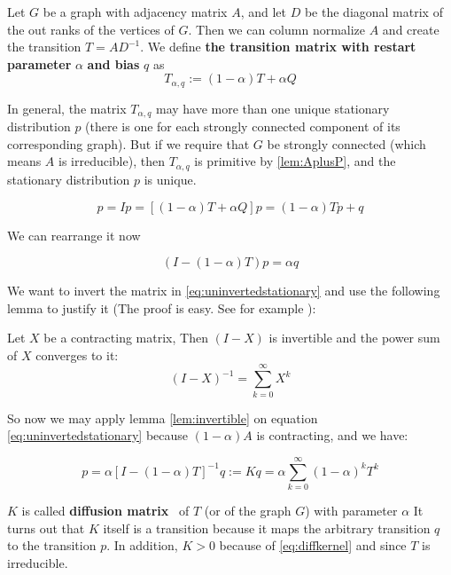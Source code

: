 \begin{mydef}
\label{def:Transitionbiased}
Let $G$ be a graph with adjacency matrix $A$, and let $D$ be the
diagonal matrix of the out ranks of the vertices of $G$. Then we can
column normalize $A$ and create the transition $T = AD^{-1}$.
We define \textbf{the transition matrix with restart parameter}
$\alpha$ \textbf{and bias} $q$ as
\[
T_{\alpha, q} :=
(1 - \alpha)T + \alpha Q
\]
\end{mydef}

In general, 
the matrix $T_{\alpha,q}$ may have more than one unique stationary distribution $p$ 
(there is one for each strongly connected
component of its corresponding graph). But if we require that $G$ be
strongly connected (which means $A$ is irreducible),
then $T_{\alpha,q}$ is primitive by \ref{lem:AplusP}, and the
stationary distribution $p$ is unique.

\[
p = Ip
= [(1 - \alpha)T + \alpha Q]p =  (1 - \alpha)Tp + q 
\]

We can rearrange it now

\begin{equation}
\label{eq:uninvertedstationary}
(I - (1 - \alpha)T)p = \alpha q
\end{equation}

We want to invert the matrix in \ref{eq:uninvertedstationary} and use the
following lemma to justify it (The proof is easy. See for example
\textcite{serre2010matrices}):

\begin{lemma}
\label{lem:invertible}
Let $X$ be a contracting matrix, Then $(I-X)$ is invertible and the power sum of
$X$ converges to it:
\[
(I - X)^{-1} = \sum_{k=0}^{\infty} X^k
\]
\end{lemma}

So now we may apply lemma \ref{lem:invertible} on equation
\ref{eq:uninvertedstationary} because $(1-\alpha)A$ is contracting, and we have:

\begin{equation}
\label{eq:diffkernel}
p = \alpha [I - (1 - \alpha)T]^{-1} q := K q = 
\alpha \sum_{k=0}^{\infty} (1 - \alpha)^k T^k
\end{equation}

$K$ is called \textbf{diffusion matrix}~\cite{leiserson2015pan} of $T$ (or of the graph $G$) with parameter $\alpha$
It turns out that $K$ itself is a transition because it maps the
arbitrary transition $q$ to the transition $p$. In addition, $K \gt 0$ because
of \ref{eq:diffkernel} and since $T$ is irreducible.

